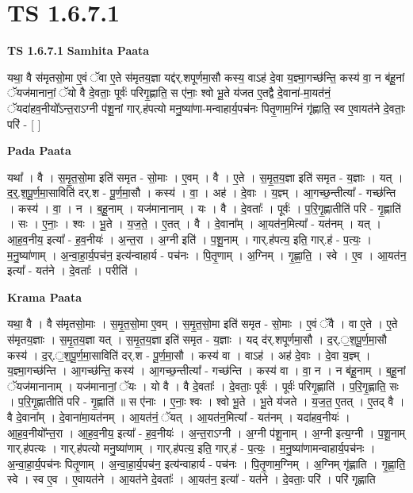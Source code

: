 \documentclass[17pt]{extarticle}
\begin{document}
\section*{ TS 1.6.7.1 }

\textbf{TS 1.6.7.1 } \newline
\textbf{Samhita Paata} \newline

यथा॒ वै स॑मृतसो॒मा ए॒वं ॅवा ए॒ते स॑मृतय॒ज्ञा यद्द॑र्.शपूर्णमा॒सौ कस्य॒ वाऽह॑ दे॒वा य॒ज्ञ्मा॒गच्छ॑न्ति॒ कस्य॑ वा॒ न ब॑हू॒नां ॅयज॑मानानां॒ ॅयो वै दे॒वताः॒ पूर्वः॑ परिगृ॒ह्णाति॒ स ए॑नाः॒ श्वो भू॒ते य॑जत ए॒तद्वै दे॒वाना॑-मा॒यत॑नं॒ ॅयदा॑हव॒नीयो᳚ऽन्त॒राऽग्नी प॑शू॒नां गार्.ह॑पत्यो मनु॒ष्या॑णा-मन्वाहार्य॒पच॑नः पितृ॒णाम॒ग्निं गृ॑ह्णाति॒ स्व ए॒वायत॑ने दे॒वताः॒ परि॑ - [ ] \newline

\textbf{Pada Paata} \newline

यथा᳚ । वै । स॒मृ॒त॒सो॒मा इति॑ समृत - सो॒माः । ए॒वम् । वै । ए॒ते । स॒मृ॒त॒य॒ज्ञा इति॑ समृत - य॒ज्ञाः । यत् । द॒र्॒.श॒पू॒र्ण॒मा॒साविति॑ दर्.श - पू॒र्ण॒मा॒सौ । कस्य॑ । वा॒ । अह॑ । दे॒वाः । य॒ज्ञ्म् । आ॒गच्छ॒न्तीत्या᳚ - गच्छ॑न्ति । कस्य॑ । वा॒ । न । ब॒हू॒नाम् । यज॑मानानाम् । यः । वै । दे॒वताः᳚ । पूर्वः॑ । प॒रि॒गृ॒ह्णातीति॑ परि - गृ॒ह्णाति॑ । सः । ए॒नाः॒ । श्वः । भू॒ते । य॒ज॒ते॒ । ए॒तत् । वै । दे॒वाना᳚म् । आ॒यत॑न॒मित्या᳚ - यत॑नम् । यत् । आ॒ह॒व॒नीय॒ इत्या᳚ - ह॒व॒नीयः॑ । अ॒न्त॒रा । अ॒ग्नी इति॑ । प॒शू॒नाम् । गार्.ह॑पत्य॒ इति॒ गार्.ह॑ - प॒त्यः॒ । म॒नु॒ष्या॑णाम् । अ॒न्वा॒हा॒र्य॒पच॑न॒ इत्य॑न्वाहार्य - पच॑नः । पि॒तृ॒णाम् । अ॒ग्निम् । गृ॒ह्णा॒ति॒ । स्वे । ए॒व । आ॒यत॑न॒ इत्या᳚ - यत॑ने । दे॒वताः᳚ । परीति॑ ।  \newline


\textbf{Krama Paata} \newline

यथा॒ वै । वै स॑मृतसो॒माः । स॒मृ॒त॒सो॒मा ए॒वम् । स॒मृ॒त॒सो॒मा इति॑ समृत - सो॒माः । ए॒वं ॅवै । वा ए॒ते । ए॒ते स॑मृतय॒ज्ञाः । स॒मृ॒त॒य॒ज्ञा यत् । स॒मृ॒त॒य॒ज्ञा इति॑ समृत - य॒ज्ञाः । यद् द॑र्.शपूर्णमा॒सौ । द॒र्.॒श॒पू॒र्ण॒मा॒सौ कस्य॑ । द॒र्.॒श॒पू॒र्ण॒मा॒साविति॑ दर्.श - पू॒र्ण॒मा॒सौ । कस्य॑ वा । वाऽह॑ । अह॑ दे॒वाः । दे॒वा य॒ज्ञ्म् । य॒ज्ञ्मा॒गच्छ॑न्ति । आ॒गच्छ॑न्ति॒ कस्य॑ । आ॒गच्छ॒न्तीत्या᳚ - गच्छ॑न्ति । कस्य॑ वा । वा॒ न । न ब॑हू॒नाम् । ब॒हू॒नां ॅयज॑मानानाम् । यज॑मानानां॒ ॅयः । यो वै । वै दे॒वताः᳚ । दे॒वताः॒ पूर्वः॑ । पूर्वः॑ परिगृ॒ह्णाति॑ । प॒रि॒गृ॒ह्णाति॒ सः । प॒रि॒गृ॒ह्णातीति॑ परि - गृ॒ह्णाति॑ ॥ स ए॑नाः । ए॒नाः॒ श्वः । श्वो भू॒ते । भू॒ते य॑जते । य॒ज॒त॒ ए॒तत् । ए॒तद् वै । वै दे॒वाना᳚म् । दे॒वाना॑मा॒यत॑नम् । आ॒यत॑नं॒ ॅयत् । आ॒यत॑न॒मित्या᳚ - यत॑नम् । यदा॑हव॒नीयः॑ । आ॒ह॒व॒नीयो᳚न्त॒रा । आ॒ह॒व॒नीय॒ इत्या᳚ - ह॒व॒नीयः॑ । अ॒न्त॒राऽग्नी । अ॒ग्नी प॑शू॒नाम् । अ॒ग्नी इत्य॒ग्नी । प॒शू॒नाम् गार्.ह॑पत्यः । गार्.ह॑पत्यो मनु॒ष्या॑णाम् । गार्.ह॑पत्य॒ इति॒ गार्.ह॑ - प॒त्यः॒ । म॒नु॒ष्या॑णामन्वाहार्य॒पच॑नः । अ॒न्वा॒हा॒र्य॒पच॑नः पितृ॒णाम् । अ॒न्वा॒हा॒र्य॒पच॑न॒ इत्य॑न्वाहार्य - पच॑नः । पि॒तृ॒णाम॒ग्निम् । अ॒ग्निम् गृ॑ह्णाति । गृ॒ह्णा॒ति॒ स्वे । स्व ए॒व । ए॒वायत॑ने । आ॒यत॑ने दे॒वताः᳚ । आ॒यत॑न॒ इत्या᳚ - यत॑ने । दे॒वताः॒ परि॑ । परि॑ गृह्णाति \newline
\end{document}
